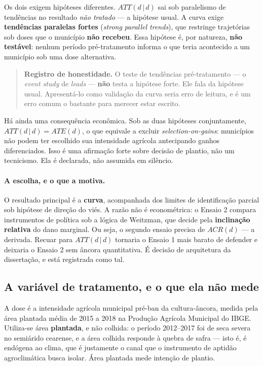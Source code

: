 Os dois exigem hipóteses diferentes. $ATT(d\,|\,d)$ sai sob paralelismo de
tendências no resultado \emph{não tratado} --- a hipótese usual. A curva exige
\textbf{tendências paralelas fortes} (\emph{strong parallel trends}), que
restringe trajetórias sob doses que o município \textbf{não recebeu}. Essa
hipótese é, por natureza, \textbf{não testável}: nenhum período pré-tratamento
informa o que teria acontecido a um município sob uma dose alternativa.

\begin{quote}
\textbf{Registro de honestidade.} O teste de tendências pré-tratamento --- o
\emph{event study} de \emph{leads} --- \textbf{não} testa a hipótese forte. Ele
fala da hipótese usual. Apresentá-lo como validação da curva seria erro de
leitura, e é um erro comum o bastante para merecer estar escrito.
\end{quote}

Há ainda uma consequência econômica. Sob as duas hipóteses conjuntamente,
$ATT(d\,|\,d) = ATE(d)$, o que equivale a excluir \emph{selection-on-gains}:
municípios não podem ter escolhido sua intensidade agrícola antecipando ganhos
diferenciados. Isso é uma afirmação forte sobre decisão de plantio, não um
tecnicismo. Ela é declarada, não assumida em silêncio.

\paragraph{A escolha, e o que a motiva.} O resultado principal é a
\textbf{curva}, acompanhada dos limites de identificação parcial sob hipótese de
direção do viés. A razão não é econométrica: o Ensaio 2 compara instrumentos de
política sob a lógica de Weitzman, que decide pela \textbf{inclinação relativa}
do dano marginal. Ou seja, o segundo ensaio precisa de $ACR(d)$ --- a derivada.
Recuar para $ATT(d\,|\,d)$ tornaria o Ensaio 1 mais barato de defender e deixaria
o Ensaio 2 sem âncora quantitativa. É decisão de arquitetura da dissertação, e
está registrada como tal.

\subsection{A variável de tratamento, e o que ela não mede}
\label{sub:dose}

A dose é a intensidade agrícola municipal pré-ban da cultura-âncora, medida pela
área plantada média de 2015 a 2018 na Produção Agrícola Municipal do IBGE.
Utiliza-se área \textbf{plantada}, e não colhida: o período 2012--2017 foi de
seca severa no semiárido cearense, e a área colhida responde à quebra de safra
--- isto é, é endógena ao clima, que é justamente o canal que o instrumento de
aptidão agroclimática busca isolar. Área plantada mede intenção de plantio.

